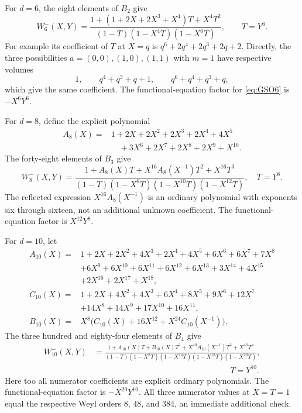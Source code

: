 \documentclass[11pt,a4paper]{article}
\theoremstyle{definition}
\begin{document}
For $d=6$, the eight elements of $B_2$ give
\begin{equation}\label{eq:GSO6}
 \boxed{W_6^-(X,Y)=
 \frac{1+(1+2X+2X^3+X^4)T+X^4T^2}
      {(1-T)(1-X^4T)(1-X^6T)},\qquad T=Y^6.}
\end{equation}
For example its coefficient of $T$ at $X=q$ is
$q^6+2q^4+2q^3+2q+2$. Directly, the three possibilities
$a=(0,0),(1,0),(1,1)$ with $m=1$ have respective volumes
\[
 1,\qquad q^4+q^3+q+1,\qquad q^6+q^4+q^3+q,
\]
which give the same coefficient. The functional-equation factor
for \eqref{eq:GSO6} is $-X^6Y^6$.

For $d=8$, define the explicit polynomial
\begin{align*}
 A_8(X)={}&1+2X+2X^2+2X^3+2X^4+4X^5\\
          &\quad+3X^6+2X^7+2X^8+2X^9+X^{10}.
\end{align*}
The forty-eight elements of $B_3$ give
\begin{equation}\label{eq:GSO8}
 W_8^-(X,Y)=
 \frac{1+A_8(X)T+X^{16}A_8(X^{-1})T^2+X^{16}T^3}
      {(1-T)(1-X^6T)(1-X^{10}T)(1-X^{12}T)},\quad T=Y^8.
\end{equation}
The reflected expression $X^{16}A_8(X^{-1})$ is an ordinary
polynomial with exponents six through sixteen, not an additional
unknown coefficient. The functional-equation factor is $X^{12}Y^8$.

For $d=10$, let
\begin{align*}
 A_{10}(X)={}&1+2X+2X^2+4X^3+2X^4+4X^5+6X^6+6X^7+7X^8\\
 &+6X^9+6X^{10}+6X^{11}+6X^{12}+6X^{13}
      +3X^{14}+4X^{15}\\
 &+2X^{16}+2X^{17}+X^{18},\\
 C_{10}(X)={}&1+2X+4X^2+4X^3+6X^4+8X^5+9X^6+12X^7\\
 &+14X^8+14X^9+17X^{10}+16X^{11},\\
 B_{10}(X)={}&X^8\bigl(C_{10}(X)+16X^{12}
                            +X^{24}C_{10}(X^{-1})\bigr).
\end{align*}
The three hundred and eighty-four elements of $B_4$ give
\begin{equation}\label{eq:GSO10}
 \begin{split}
 W_{10}^-(X,Y)&=
 \frac{1+A_{10}(X)T+B_{10}(X)T^2
              +X^{40}A_{10}(X^{-1})T^3+X^{40}T^4}
      {(1-T)(1-X^8T)(1-X^{14}T)(1-X^{18}T)(1-X^{20}T)},\\
 &\hspace{7cm}T=Y^{10}.
 \end{split}
\end{equation}
Here too all numerator coefficients are explicit ordinary
polynomials. The functional-equation factor is $-X^{20}Y^{10}$.
All three numerator values at $X=T=1$ equal the respective Weyl
orders $8$, $48$, and $384$, an immediate additional check.
\end{document}
